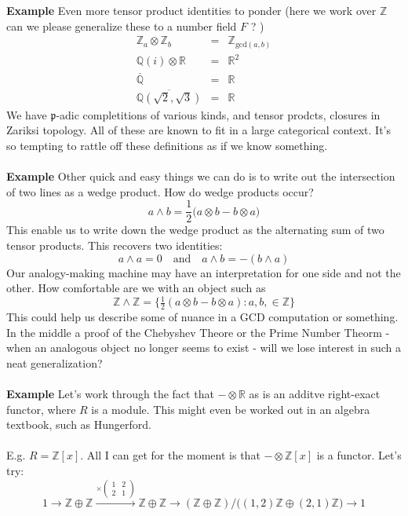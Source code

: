 \documentclass[12pt]{article}
\begin{document}
\noindent \textbf{Example} Even more tensor product identities to ponder (here we work over $\mathbb{Z}$ can we please generalize these to a number field $F$ ? )
\begin{eqnarray*}
\mathbb{Z}_a \otimes \mathbb{Z}_b&=& \mathbb{Z}_{\text{gcd}(a,b)} \\ 
\mathbb{Q}(i) \otimes \mathbb{R} &=& \mathbb{R}^2 \\ 
\overline{\mathbb{Q}} &=& \mathbb{R} \\ 
\overline{\mathbb{Q}(\sqrt{2}, \sqrt{3})} &=& \mathbb{R}
\end{eqnarray*}
We have $\mathfrak{p}$-adic completitions of various kinds, and tensor prodcts, closures in Zariksi topology.  All of these are known to fit in a large categorical context. It's so tempting to rattle off these definitions as if we know something. \\ \\
\noindent \textbf{Example} Other quick and easy things we can do is to write out the intersection of two lines as a wedge product.  How do wedge products occur?
$$ a \wedge b = \frac{1}{2} \big( a \otimes b - b \otimes a  \big) $$
This enable us to write down the wedge product as the alternating sum of two tensor products.  This recovers two identities:
$$ a \wedge a = 0 \quad\text{and}\quad a \wedge b = - (b \wedge a)$$ 
Our analogy-making machine may have an interpretation for one side and not the other.  How comfortable are we with an object such as 
$$ \mathbb{Z}\wedge \mathbb{Z} = \Big\{ \tfrac{1}{2}(a \otimes b - b \otimes a ) : a, b, \in \mathbb{Z}  \Big\} $$
This could help us describe some of nuance in a GCD computation or something.  In the middle a proof of the Chebyshev Theore or the Prime Number Theorm - when an analogous object no longer seems to exist - will we lose interest in such a neat generalization? \\ \\
\textbf{Example} Let's work through the fact that $- \otimes \mathbb{R}$ as is an additve right-exact functor, where $R$ is a module.  This might even be worked out in an algebra textbook, such as Hungerford. \\ \\
E.g. $R = \mathbb{Z}[x]$. All I can get for the moment is that $-\otimes \mathbb{Z}[x]$ is a functor.  Let's try:
$$ 1 \longrightarrow \mathbb{Z} \oplus \mathbb{Z} \stackrel{ \times\left( \begin{array}{cc} 1 & 2 \\ 2 & 1 \end{array} \right)}{\longrightarrow}  \mathbb{Z} 
\oplus \mathbb{Z} \longrightarrow
(\mathbb{Z} \oplus \mathbb{Z}) / \Big( (1,2) \mathbb{Z} \oplus (2,1) \mathbb{Z} \Big) \longrightarrow 1$$
\end{document}
